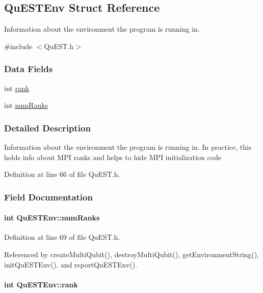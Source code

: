 \hypertarget{structQuESTEnv}{
\subsection{QuESTEnv Struct Reference}
\label{structQuESTEnv}
}


Information about the environment the program is running in.  


{\ttfamily \#include $<$QuEST.h$>$}\subsubsection*{Data Fields}
\begin{DoxyCompactItemize}
\item 
int \hyperlink{structQuESTEnv_aa648bb336cf8598467cb62db00b9cee8}{rank}
\item 
int \hyperlink{structQuESTEnv_af22aacd7c9905accae28484785c193b4}{numRanks}
\end{DoxyCompactItemize}


\subsubsection{Detailed Description}
Information about the environment the program is running in. In practice, this holds info about MPI ranks and helps to hide MPI initialization code 

Definition at line 66 of file QuEST.h.

\subsubsection{Field Documentation}
\hypertarget{structQuESTEnv_af22aacd7c9905accae28484785c193b4}{
\paragraph[{numRanks}]{\setlength{\rightskip}{0pt plus 5cm}int {\bf QuESTEnv::numRanks}}\hfill}
\label{structQuESTEnv_af22aacd7c9905accae28484785c193b4}


Definition at line 69 of file QuEST.h.

Referenced by createMultiQubit(), destroyMultiQubit(), getEnvironmentString(), initQuESTEnv(), and reportQuESTEnv().\hypertarget{structQuESTEnv_aa648bb336cf8598467cb62db00b9cee8}{
\paragraph[{rank}]{\setlength{\rightskip}{0pt plus 5cm}int {\bf QuESTEnv::rank}}\hfill}
\label{structQuESTEnv_aa648bb336cf8598467cb62db00b9cee8}


